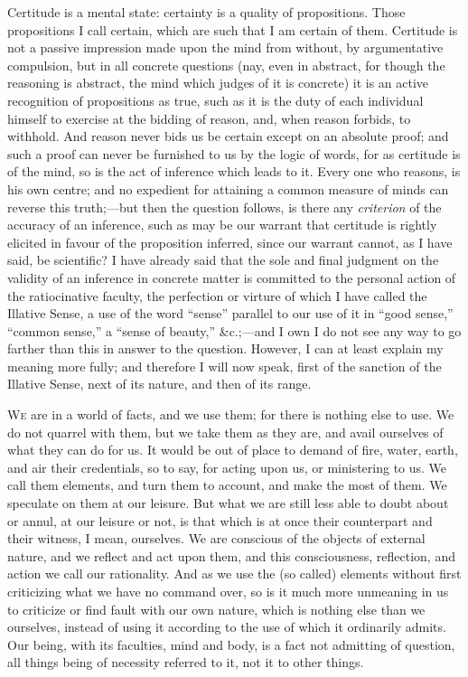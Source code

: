 Certitude is a mental state: certainty is a quality of
propositions. Those propositions I call certain, which are such that I
am certain of them. Certitude is not a passive impression made upon
the mind from without, by argumentative compulsion, but in all
concrete questions (nay, even in abstract, for though the reasoning is
abstract, the mind which judges of it is concrete) it is an
active recognition of propositions as true, such as it is the duty of
each individual himself to exercise at the bidding of reason, and,
when reason forbids, to withhold. And reason never bids us be certain
except on an absolute proof; and such a proof can never be furnished
to us by the logic of words, for as certitude is of the mind, so is
the act of inference which leads to it. Every one who reasons, is his
own centre; and no expedient for attaining a common measure of minds
can reverse this truth;—but then the question follows, is there any \emph{criterion}
of the accuracy of an inference, such as may be our warrant that
certitude is rightly elicited in favour of the proposition inferred,
since our warrant cannot, as I have said, be scientific? I have
already said that the sole and final judgment on the validity of an
inference in concrete matter is committed to the personal action of
the ratiocinative faculty, the perfection or virture of which I have
called the Illative Sense, a use of the word ``sense''
parallel to our use of it in ``good sense,'' ``common
sense,'' a ``sense of beauty,'' \&c.;—and I own I do
not see any way to go farther than this in answer to the question.
However, I can at least explain my meaning more fully; and therefore I
will now speak, first of the sanction of the Illative Sense, next of
its nature, and then of its range.


W\textsc{e} are in a world of facts, and we use them; for there is nothing
else to use. We do not quarrel with them, but we take them as they
are, and avail ourselves of what they can do for us. It would be out
of place to demand of fire, water, earth, and air their credentials,
so to say, for acting upon us, or ministering to us. We call them
elements, and turn them to account, and make the most of them. We
speculate on them at our leisure. But what we are still less able to
doubt about or annul, at our leisure or not, is that which is at once
their counterpart and their witness, I mean, ourselves. We are
conscious of the objects of external nature, and we reflect and act
upon them, and this consciousness, reflection, and action we call our
rationality. And as we use the (so called) elements without first
criticizing what we have no command over, so is it much more unmeaning
in us to criticize or find fault with our own nature, which is nothing
else than we ourselves, instead of using it according to the use of
which it ordinarily admits. Our being, with its faculties, mind and
body, is a fact not admitting of question, all things being of
necessity referred to it, not it to other things.

